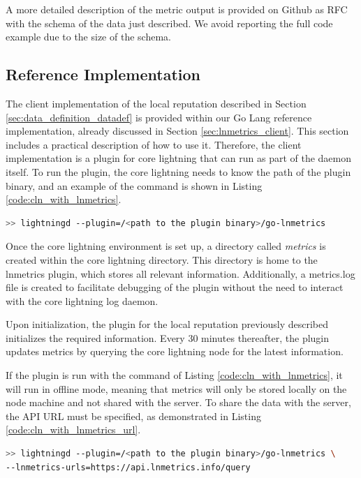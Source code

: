 A more detailed description of the metric output is provided on Github as RFC with 
the  schema of the data just described. We avoid reporting the full code example 
due to the size of the  schema.

\subsection{Reference Implementation}

The client implementation of the local reputation described in Section \ref{sec:data_definition_datadef} 
is provided within our Go Lang reference implementation, already  discussed in Section \ref{sec:lnmetrics_client}. 
This section includes a practical description of how to use it. Therefore, the client implementation is 
a plugin for core lightning that can run as part of the daemon itself. To run the plugin, the core lightning 
needs to know the path of the plugin binary, and an example of the command is shown in
Listing \ref{code:cln_with_lnmetrics}.

\begin{lstlisting}[language=bash, basicstyle=\small,
                  caption={Command to run the core lightning daemon with the lnmetrics plugin enabled.}, 
                  label={code:cln_with_lnmetrics}]
>> lightningd --plugin=/<path to the plugin binary>/go-lnmetrics
\end{lstlisting}

Once the core lightning environment is set up, a directory called \emph{metrics} 
is created within the core lightning directory. This directory is home to the 
lnmetrics plugin, which stores all relevant information. Additionally, a metrics.log 
file is created to facilitate debugging of the plugin without the need to 
interact with the core lightning log daemon.

Upon initialization, the plugin for the local reputation previously described 
initializes the required information. Every 30 minutes thereafter, the plugin
updates metrics by querying the core lightning node for the latest information.

If the plugin is run with the command of Listing \ref{code:cln_with_lnmetrics}, it will run
in offline mode, meaning that metrics will only be stored locally on the node
machine and not shared with the server. To share the data with the server, the 
API URL must be specified, as demonstrated in Listing \ref{code:cln_with_lnmetrics_url}.

\begin{lstlisting}[language=bash, basicstyle=\small,
                  caption={Command to run core lightning with the lnmetrics plugin an publish the data.}, 
                  label={code:cln_with_lnmetrics_url}]
>> lightningd --plugin=/<path to the plugin binary>/go-lnmetrics \ 
--lnmetrics-urls=https://api.lnmetrics.info/query
\end{lstlisting}

